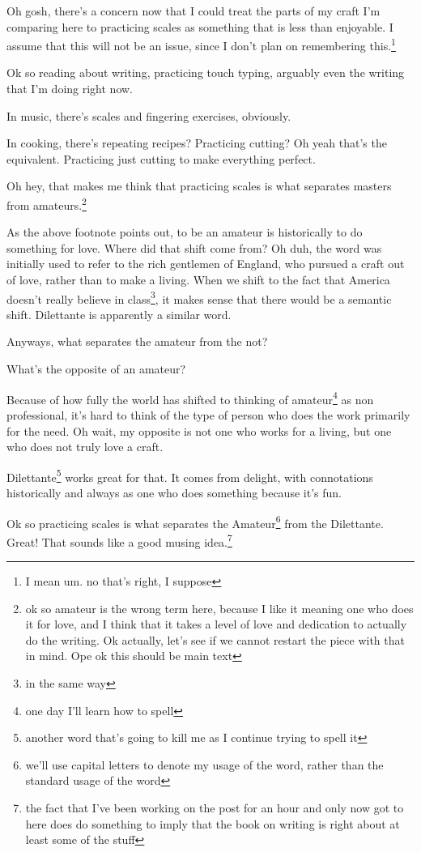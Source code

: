\documentclass[12pt]{article}[titlepage]
\newcommand{\1}{\={a}}
\newcommand{\2}{\={e}}
\newcommand{\3}{\={\i}}
\newcommand{\4}{\=o}
\newcommand{\5}{\=u}
\newcommand{\6}{\={A}}
\renewcommand{\,}{\textsuperscript{,}}
\begin{document}
Oh gosh, there's a concern now that I could treat the parts of my craft I'm comparing here to practicing scales as something that is less than enjoyable.
I assume that this will not be an issue, since I don't plan on remembering this.\footnote{I mean um. no that's right, I suppose}

Ok so reading about writing, practicing touch typing, arguably even the writing that I'm doing right now.

In music, there's scales and fingering exercises, obviously.

In cooking, there's repeating recipes?
Practicing cutting?
Oh yeah that's the equivalent.
Practicing just cutting to make everything perfect.

Oh hey, that makes me think that practicing scales is what separates masters from amateurs.\footnote{ok so amateur is the wrong term here, because I like it meaning one who does it for love, and I think that it takes a level of love and dedication to actually do the writing. Ok actually, let's see if we cannot restart the piece with that in mind. Ope ok this should be main text}

As the above footnote points out, to be an amateur is historically to do something for love.
Where did that shift come from?
Oh duh, the word was initially used to refer to the rich gentlemen of England, who pursued a craft out of love, rather than to make a living.
When we shift to the fact that America doesn't really believe in class\footnote{in the same way}, it makes sense that there would be a semantic shift.
Dilettante is apparently a similar word.

Anyways, what separates the amateur from the not?

What's the opposite of an amateur?

Because of how fully the world has shifted to thinking of amateur\footnote{one day I'll learn how to spell} as non professional, it's hard to think of the type of person who does the work primarily for the need.
Oh wait, my opposite is not one who works for a living, but one who does not truly love a craft.

Dilettante\footnote{another word that's going to kill me as I continue trying to spell it} works great for that.
It comes from delight, with connotations historically and always as one who does something because it's fun.

Ok so practicing scales is what separates the Amateur\footnote{we'll use capital letters to denote my usage of the word, rather than the standard usage of the word} from the Dilettante.
Great! That sounds like a good musing idea.\footnote{the fact that I've been working on the post for an hour and only now got to here does do something to imply that the book on writing is right about at least some of the stuff}
\end{document}
